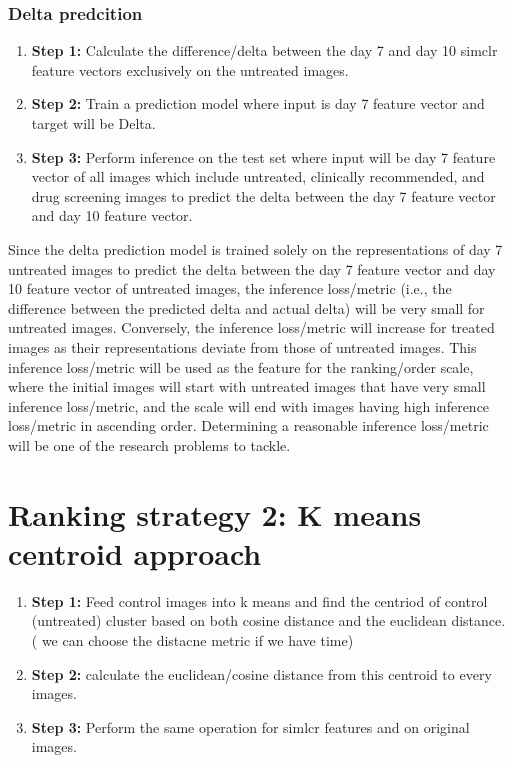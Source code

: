 \subsubsection{Delta predcition}
\begin{enumerate}
  \item \textbf{Step 1:} Calculate the difference/delta between the day 7 and day 10 simclr 
  feature vectors  exclusively on the untreated images.
  \item \textbf{Step 2:} Train a prediction model where input is day 7 feature vector 
  and target will be Delta.


  \item \textbf{Step 3:} Perform inference on the test set where input will be day 7 feature vector of all images which include untreated, clinically recommended, and drug screening images to predict the delta between the day 7 feature vector  and day 10 feature vector.
\end{enumerate}

Since the delta prediction model is trained solely on the representations of day 
7 untreated  images to predict the delta between the day 7 feature vector 
and day 10 feature vector of untreated images,
 the inference loss/metric (i.e., the difference between the predicted delta and actual
  delta) will be very small for untreated images. Conversely,
   the inference loss/metric will increase for treated images as their representations 
   deviate from those of untreated images. This inference loss/metric will be used as 
   the feature for the ranking/order scale, where the initial images will start with 
   untreated images that have very small inference loss/metric, and the scale will end 
   with images having high inference loss/metric in ascending order. 
   Determining a reasonable inference loss/metric will be one of the research problems 
   to tackle.



\section{Ranking strategy 2: K means centroid approach}

\begin{enumerate}
  \item \textbf{Step 1:} Feed control images into k means and find the centriod of control (untreated) cluster based on both cosine distance and the euclidean distance. ( we can choose the distacne metric if we have time)
  
  \item \textbf{Step 2:} calculate the euclidean/cosine distance from this centroid to every images.
  
  \item \textbf{Step 3:} Perform the same operation for simlcr features and on original images.
\end{enumerate}


